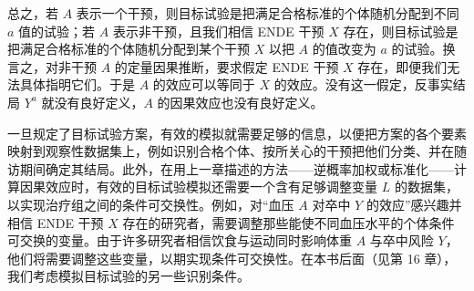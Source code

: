 
总之，若 $A$ 表示一个干预，则目标试验是把满足合格标准的个体随机分配到不同 $a$ 值的试验；若 $A$ 表示非干预，且我们相信 ENDE 干预 $X$ 存在，则目标试验是把满足合格标准的个体随机分配到某个干预 $X$ 以把 $A$ 的值改变为 $a$ 的试验。换言之，对非干预 $A$ 的定量因果推断，要求假定 ENDE 干预 $X$ 存在，即便我们无法具体指明它们。于是 $A$ 的效应可以等同于 $X$ 的效应。没有这一假定，反事实结局 $Y^{a}$ 就没有良好定义，$A$ 的因果效应也没有良好定义。

一旦规定了目标试验方案，有效的模拟就需要足够的信息，以便把方案的各个要素映射到观察性数据集上，例如识别合格个体、按所关心的干预把他们分类、并在随访期间确定其结局。此外，在用上一章描述的方法——逆概率加权或标准化——计算因果效应时，有效的目标试验模拟还需要一个含有足够调整变量 $L$ 的数据集，以实现治疗组之间的条件可交换性。例如，对“血压 $A$ 对卒中 $Y$ 的效应”感兴趣并相信 ENDE 干预 $X$ 存在的研究者，需要调整那些能使不同血压水平的个体条件可交换的变量。由于许多研究者相信饮食与运动同时影响体重 $A$ 与卒中风险 $Y$，他们将需要调整这些变量，以期实现条件可交换性。在本书后面（见第 16 章），我们考虑模拟目标试验的另一些识别条件。

